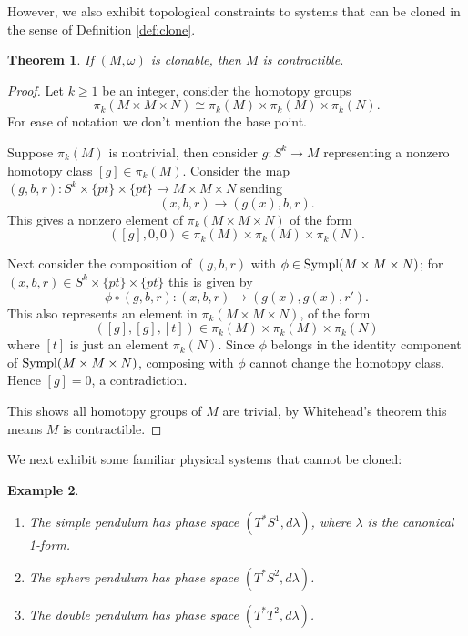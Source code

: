 \documentclass[jmp,amsmath,amssymb]{revtex4-1}
\theoremstyle{plain}
\newtheorem{theorem}{Theorem}[section]
\newtheorem{example}[theorem]{Example}
\begin{document}
However, we also exhibit topological constraints to systems that can be cloned in the sense of Definition \ref{def:clone}.

\begin{theorem}\label{thm:clone}
If $(M,\omega)$ is clonable, then $M$ is contractible.
\end{theorem}

\begin{proof}
    Let $k\geq 1$ be an integer, consider the homotopy groups
    \[
    \pi_k (M\times M \times N) \cong \pi_k(M) \times  \pi_k(M) \times \pi_k(N).
    \]
For ease of notation we don't mention the base point. 

Suppose $\pi_k(M)$ is nontrivial, then consider $g:S^k \rightarrow M$ representing a nonzero homotopy class $[g]\in \pi_k(M)$. Consider
the map $(g,b,r): S^k\times \{pt\} \times \{pt\} \rightarrow M \times M \times N$ sending \[(x,b,r) \rightarrow (g(x), b,r).\] This gives a nonzero element of $\pi_k(M\times M \times N)$ of the form \[([g],0,0) \in \pi_k(M)\times \pi_k(M) \times \pi_k(N).\]

Next consider the composition of $(g,b,r)$ with $\phi \in \textup{Sympl}(M\times M \times N)$; for $(x,b,r) \in S^k \times \{pt\} \times \{pt\}$ this is given by
\[
\phi \circ (g,b,r): (x,b,r) \rightarrow (g(x),g(x), r').
\]
This also represents an element in $\pi_k(M\times M \times N)$, of the form
\[
([g],[g],[t]) \in \pi_k(M)\times \pi_k (M) \times \pi_k(N)
\]
where $[t]$ is just an element $\pi_k(N)$. Since $\phi$ belongs in the identity component of $\textup{Sympl}(M\times M \times N)$, composing with $\phi$ cannot change the homotopy class. Hence $[g]=0$, a contradiction.

This shows all homotopy groups of $M$ are trivial, by Whitehead's theorem this means $M$ is contractible.
\end{proof}

We next exhibit some familiar physical systems that cannot be cloned:
\begin{example}
\begin{enumerate}
    \item The simple pendulum has phase space $(T^*S^1,d\lambda)$, where $\lambda$ is the canonical 1-form.
    \item The sphere pendulum has phase space $(T^*S^2, d\lambda)$.
    \item The double pendulum has phase space $(T^*T^2,d\lambda)$.
\end{enumerate}
\end{example}
\end{document}
